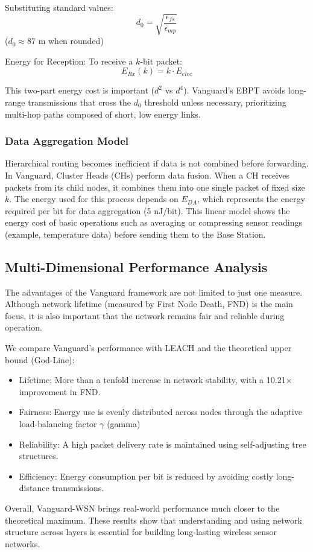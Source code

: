 \documentclass[conference]{IEEEtran}
\begin{document}
Substituting standard values:
\begin{equation}
d_0 = \sqrt{\frac{\epsilon_{fs}}{\epsilon_{mp}}}
\end{equation}
($d_0 \approx 87$ m when rounded)

Energy for Reception:
To receive a $k$-bit packet:
\begin{equation}
E_{Rx}(k) = k \cdot E_{elec}
\end{equation}

This two-part energy cost is important ($d^2$ vs $d^4$). Vanguard's EBPT avoids long-range transmissions that cross the $d_0$ threshold unless necessary, prioritizing multi-hop paths composed of short, low energy links.

\subsubsection{Data Aggregation Model}
Hierarchical routing becomes inefficient if data is not combined before forwarding. In Vanguard, Cluster Heads (CHs) perform data fusion. When a CH receives packets from its child nodes, it combines them into one single packet of fixed size $k$.
The energy used for this process depends on $E_{DA}$, which represents the energy required per bit for data aggregation (5 nJ/bit). This linear model shows the energy cost of basic operations such as averaging or compressing sensor readings (example, temperature data) before sending them to the Base Station.

\subsection{Multi-Dimensional Performance Analysis}
The advantages of the Vanguard framework are not limited to just one measure. Although network lifetime (measured by First Node Death, FND) is the main focus, it is also important that the network remains fair and reliable during operation.

We compare Vanguard’s performance with LEACH and the theoretical upper bound (God-Line):
\begin{itemize}
    \item Lifetime: More than a tenfold increase in network stability, with a 10.21$\times$ improvement in FND.
    \item Fairness: Energy use is evenly distributed across nodes through the adaptive load-balancing factor $\gamma$ (gamma)
    \item Reliability: A high packet delivery rate is maintained using self-adjusting tree structures.
    \item Efficiency: Energy consumption per bit is reduced by avoiding costly long-distance transmissions.
\end{itemize}
Overall, Vanguard-WSN brings real-world performance much closer to the theoretical maximum. These results show that understanding and using network structure across layers is essential for building long-lasting wireless sensor networks.
\end{document}
